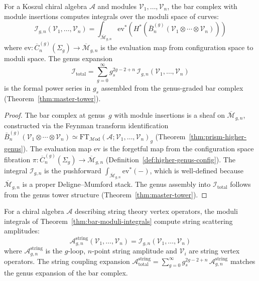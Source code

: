 \begin{theorem}\label{thm:bar-moduli-integrals}
For a Koszul chiral algebra $\mathcal{A}$ and modules $\mathcal{V}_1, \ldots, \mathcal{V}_n$, the bar complex with module insertions computes integrals over the moduli space of curves:
\[\mathcal{I}_{g,n}(\mathcal{V}_1,\ldots,\mathcal{V}_n) = \int_{\overline{\mathcal{M}}_{g,n}} \mathrm{ev}^*\left(H^*(\bar{B}^{(g)}_n(\mathcal{V}_1 \otimes \cdots \otimes \mathcal{V}_n))\right)\]
where $\mathrm{ev}\colon \overline{C}_n^{(g)}(\Sigma_g) \to \overline{\mathcal{M}}_{g,n}$ is the evaluation map from configuration space to moduli space.  The genus expansion
\[\mathcal{I}_{\mathrm{total}} = \sum_{g=0}^\infty g_s^{2g-2+n}\, \mathcal{I}_{g,n}(\mathcal{V}_1,\ldots,\mathcal{V}_n)\]
is the formal power series in $g_s$ assembled from the genus-graded bar complex (Theorem~\ref{thm:master-tower}).
\end{theorem}

\begin{proof}
The bar complex at genus~$g$ with module insertions is a sheaf on $\overline{\mathcal{M}}_{g,n}$, constructed via the Feynman transform identification $\bar{B}^{(g)}_n(\mathcal{V}_1 \otimes \cdots \otimes \mathcal{V}_n) \simeq \mathrm{FT}_{\mathcal{M}\mathrm{od}}(\mathcal{A}; \mathcal{V}_1, \ldots, \mathcal{V}_n)_g$ (Theorem~\ref{thm:prism-higher-genus}).  The evaluation map $\mathrm{ev}$ is the forgetful map from the configuration space fibration $\pi\colon \overline{C}_n^{(g)}(\Sigma_g) \to \overline{\mathcal{M}}_{g,n}$ (Definition~\ref{def:higher-genus-config}).  The integral $\mathcal{I}_{g,n}$ is the pushforward $\int_{\overline{\mathcal{M}}_{g,n}} \mathrm{ev}^*(-)$, which is well-defined because $\overline{\mathcal{M}}_{g,n}$ is a proper Deligne--Mumford stack.  The genus assembly into $\mathcal{I}_{\mathrm{total}}$ follows from the genus tower structure (Theorem~\ref{thm:master-tower}).
\end{proof}

\begin{conjecture}[String amplitude = bar complex cohomology; \ClaimStatusConjectured]\label{conj:string-amplitude-bar}
For a chiral algebra $\mathcal{A}$ describing string theory vertex operators, the moduli integrals of Theorem~\ref{thm:bar-moduli-integrals} compute string scattering amplitudes:
\[\mathcal{A}_{g,n}^{\mathrm{string}}(\mathcal{V}_1,\ldots,\mathcal{V}_n) = \mathcal{I}_{g,n}(\mathcal{V}_1,\ldots,\mathcal{V}_n)\]
where $\mathcal{A}_{g,n}^{\mathrm{string}}$ is the $g$-loop, $n$-point string amplitude and $\mathcal{V}_i$ are string vertex operators.  The string coupling expansion $\mathcal{A}^{\mathrm{string}}_{\mathrm{total}} = \sum_{g=0}^\infty g_s^{2g-2+n}\, \mathcal{A}_{g,n}^{\mathrm{string}}$ matches the genus expansion of the bar complex.
\end{conjecture}

